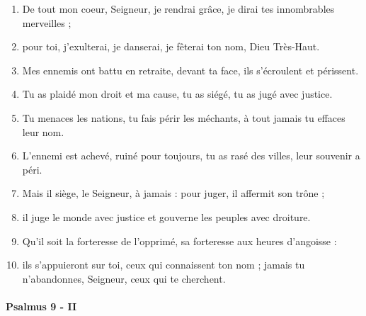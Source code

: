 \documentclass[twoside]{article}
\begin{document}
\begin{paracol}[1]{2}
\begin{enumerate}[wide, itemsep=0mm, labelwidth=!, labelindent=0pt, label=\color{gregoriocolor}\theenumi]
\item De tout mon coeur, Seigneur, je rendrai grâce, je dirai tes innombrables merveilles ;
\item pour toi, j'exulterai, je danserai, je fêterai ton nom, Dieu Très-Haut.
\item Mes ennemis ont battu en retraite, devant ta face, ils s'écroulent et périssent.
\item Tu as plaidé mon droit et ma cause, tu as siégé, tu as jugé avec justice.
\item Tu menaces les nations, tu fais périr les méchants, à tout jamais tu effaces leur nom.
\item L'ennemi est achevé, ruiné pour toujours, tu as rasé des villes, leur souvenir a péri.
\item Mais il siège, le Seigneur, à jamais : pour juger, il affermit son trône ;
\item il juge le monde avec justice et gouverne les peuples avec droiture.
\item Qu'il soit la forteresse de l'opprimé, sa forteresse aux heures d'angoisse :
\item ils s'appuieront sur toi, ceux qui connaissent ton nom ; jamais tu n'abandonnes, Seigneur, ceux qui te cherchent.
\end{enumerate}

\newpage
\switchcolumn*

\paragraph{Psalmus 9 - II}



\end{paracol}
\end{document}
